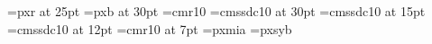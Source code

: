 \font\titoloCap=pxr at 25pt
\font\titoloCapUno=pxb at 30pt
\font{}=cmr10
\font\capitolofont=cmssdc10 at 30pt
\font\sezionefont=cmssdc10 at 15pt
\font\sottosezionefont=cmssdc10 at 12pt
\font\footnotefont=cmr10 at 7pt
\font\Gotico=pxmia%
\font\Gruppi=pxsyb%

